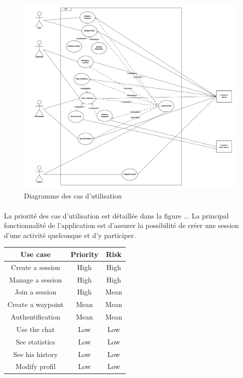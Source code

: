 \documentclass[titlepage, 12pt]{report}
\begin{document}
\begin{figure}[!h]
	\caption{Diagramme des cas d'utilisation}
	\label{use_case_diagram}
	\centering
	\includegraphics[scale=0.5]{Images/diagram/use_case_diagram.png}
\end{figure}

\paragraph{}La priorité des cas d'utilisation est détaillée dans la figure ... La principal fonctionnalité de l'application est d'assurer la possibilité de créer une session d'une activité quelconque et d'y participer.

\begin{center}
	\begin{tabular}{|c|c|c|}
		\hline
		Use case & Priority & Risk \\ \hline
		Create a session & High & High \\ \hline
		Manage a session & High & High \\ \hline
		Join a session & High & Mean \\ \hline
		Create a waypoint & Mean & Mean \\ \hline
		Authentification & Mean & Mean \\ \hline
		Use the chat & Low & Low \\ \hline
		See statistics & Low & Low \\ \hline
		See his history & Low & Low \\ \hline
		Modify profil & Low & Low \\
		\hline \hline
	\end{tabular}
\end{center}
\end{document}
